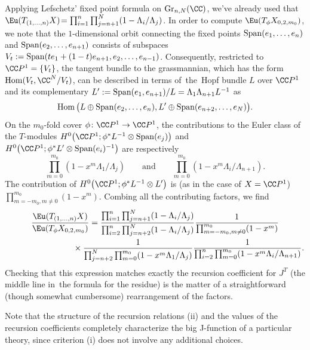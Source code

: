 Applying Lefschetz' fixed point formula on ${\rm Gr}_{n,N}(\CC)$, we've already used that $\Eu(T_{(1,\dots,n)}X)\!=\prod_{i=1}^n\prod_{j=n+1}^N(1-\Lambda_i/\Lambda_j)$. In order to compute $\Eu(T_{\phi}X_{0,2,m_0})$, we note that the $1$-dimensional orbit connecting the fixed points $\mathop{\rm Span} (e_1,\dots,e_n)$ and $\mathop{\rm Span} (e_2,\dots,e_{n+1})$ consists of subspaces $V_t:=\mathop{\rm Span}(t e_1+(1-t) e_{n+1}, e_2,\dots,e_{n-1})$. Consequently, restricted to $\CC P^1=\{ V_t \}$, the tangent bundle to the grassmannian, which has the form $\mathop{\rm Hom} (V_t,\CC^N/V_t)$, can be described in terms of~the~Hopf bundle $L$ over $\CC P^1$ and its complementary $L':=\mathop{\rm Span}(e_1,e_{n+1})/L=\Lambda_1\Lambda_{n+1}L^{-1}$ as
\[
\mathop{\rm Hom} \big(L \oplus \mathop{\rm Span}(e_2,\dots,e_n), L' \oplus \mathop{\rm Span}(e_{n+2},\dots,e_N)\big).
\]
On the $m_0$-fold cover $\phi\colon \CC P^1\to \CC P^1$, the contributions to the Euler class of the $T$-modules $H^0\big(\CC P^1; \phi^*L^{-1}\otimes \mathop{\rm Span} (e_j)\big)$ and $H^0\big(\CC P^1; \phi^*L'\otimes \mathop{\rm Span}(e_i)^{-1}\big)$ are respectively
\[
\prod_{m=0}^{m_0}(1-x^m\Lambda_1/\Lambda_j)\qquad \text{and}\qquad \prod_{m=0}^{m_0}(1-x^m\Lambda_i/\Lambda_{n+1}).
\]
The contribution of $H^0\big(\CC P^1; \phi^*L^{-1}\otimes L'\big)$ is (as in the case of $X=\CC P^1$) $\prod_{m=-m_0, m\neq 0}^{m_0}(1-x^m)$. Combing all the contributing factors, we find
\begin{gather*}
\frac{\Eu(T_{(1,\dots,n)}X)}{\Eu(T_{\phi}X_{0,2,m_0})}=
\frac{\prod_{i=1}^n\prod_{j=n+1}^N(1-\Lambda_i/\Lambda_j)}
{\prod_{i=2}^n\prod_{j=n+2}^N(1-\Lambda_i/\Lambda_j)}
\frac{1}{\prod_{m=-m_0, m\neq 0}^{m_0}(1-x^m)}
\\ \hphantom{\frac{\Eu(T_{(1,\dots,n)}X)}{\Eu(T_{\phi}X_{0,2,m_0})}=}
{}\times \frac{1}{\prod_{j=n+2}^N\prod_{m=0}^{m_0}(1-x^m\Lambda_1/\Lambda_j)}
\frac{1}{\prod_{i=2}^n\prod_{m=0}^{m_0}(1-x^m\Lambda_i/\Lambda_{n+1})}.
\end{gather*}
Checking that this expression matches exactly the recursion coefficient for $J^T$ (the middle line in~the formula for the residue) is the matter of a straightforward (though somewhat cumbersome) rearrangement of the factors.

\begin{Remark}\label{rmk3}
Note that the structure of the recursion relations (ii) and the values of the recursion coefficients completely characterize the big J-function of a particular theory, since criterion (i) does not involve any additional choices.
\end{Remark}

